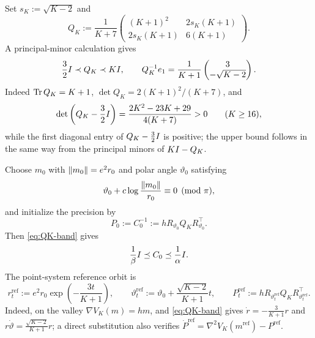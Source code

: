 Set $s_K:=\sqrt{K-2}$ and
\begin{equation}\label{eq:QK}
    Q_K:=\frac1{K+7}
    \begin{pmatrix}
        (K+1)^2 & 2s_K(K+1)\\
        2s_K(K+1) & 6(K+1)
    \end{pmatrix}.
\end{equation}
A principal-minor calculation gives
\begin{equation}\label{eq:QK-band}
    \frac32I\prec Q_K\prec KI,
    \qquad
    Q_K^{-1}e_1=\frac1{K+1}\begin{pmatrix}3\\-\sqrt{K-2}\end{pmatrix}.
\end{equation}
Indeed $\operatorname{Tr} Q_K=K+1$, $\det Q_K=2(K+1)^2/(K+7)$, and
\begin{equation*}
    \det\left(Q_K-\frac32I\right)=\frac{2K^2-23K+29}{4(K+7)}>0
    \qquad(K\geq16),
\end{equation*}
while the first diagonal entry of $Q_K-\tfrac32I$ is positive; the upper bound follows in the
same way from the principal minors of $KI-Q_K$.

Choose $m_0$ with $\left\lVert m_0\right\rVert=e^2r_0$ and polar angle $\vartheta_0$ satisfying
\begin{equation}\label{eq:valley-phase-init}
    \vartheta_0+c\log\frac{\left\lVert m_0\right\rVert}{r_0}\equiv0\pmod\pi,
\end{equation}
and initialize the precision by
\begin{equation}\label{eq:spiral-P0}
    P_0:=C_0^{-1}:=hR_{\vartheta_0}Q_KR_{\vartheta_0}^\top .
\end{equation}
Then \eqref{eq:QK-band} gives
\begin{equation}\label{eq:spiral-C0-band}
    \frac1\beta I\preceq C_0\preceq\frac1\alpha I .
\end{equation}
The point-system reference orbit is
\begin{equation}\label{eq:reference-orbit}
    r_t^{\mathrm{ref}}:=e^2r_0\exp\left(-\frac{3t}{K+1}\right),
    \qquad
    \vartheta_t^{\mathrm{ref}}:=\vartheta_0+\frac{\sqrt{K-2}}{K+1}t,
    \qquad
    P_t^{\mathrm{ref}}:=hR_{\vartheta_t^{\mathrm{ref}}}Q_KR_{\vartheta_t^{\mathrm{ref}}}^\top .
\end{equation}
Indeed, on the valley $\nabla V_K(m)=hm$, and \eqref{eq:QK-band} gives
$\dot r=-\tfrac3{K+1}r$ and $r\dot\vartheta=\tfrac{\sqrt{K-2}}{K+1}r$; a direct substitution
also verifies $\dot P^{\mathrm{ref}}=\nabla^2V_K(m^{\mathrm{ref}})-P^{\mathrm{ref}}$.

